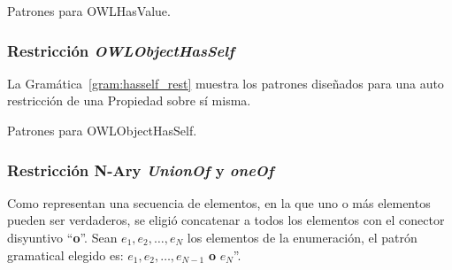 \begin{GrammarEnv}
\begin{grammar}
\end{grammar}
\caption{Patrones para OWLHasValue.}\label{gram:hasvalue_rest}
\end{GrammarEnv}

\subsubsection{Restricción \emph{OWLObjectHasSelf}}
La Gramática~\ref{gram:hasself_rest} muestra los patrones diseñados para una auto restricción de una Propiedad sobre sí misma.

\begin{GrammarEnv}
\begin{grammar}
\end{grammar}
\caption{Patrones para OWLObjectHasSelf.}\label{gram:hasself_rest}
\end{GrammarEnv}


\subsubsection{Restricción N-Ary \emph{UnionOf} y \emph{oneOf}} 
Como representan una secuencia de elementos, en la que uno o más elementos pueden ser verdaderos, se eligió concatenar a todos los elementos con el conector disyuntivo ``\textbf{o}''.  
Sean $e_1, e_2,\ldots,e_N$ los elementos de la enumeración, el patrón gramatical elegido es: $e_1, e_2,\ldots,e_{N-1}$ {\textbf{o}} $e_N$''.


